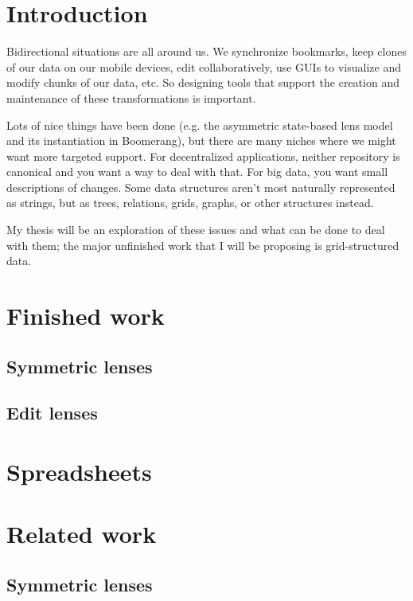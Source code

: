 \documentclass{book}
\begin{document}

\chapter{Introduction}
Bidirectional situations are all around us. We synchronize bookmarks, keep
clones of our data on our mobile devices, edit collaboratively, use GUIs to
visualize and modify chunks of our data, etc. So designing tools that
support the creation and maintenance of these transformations is important.

Lots of nice things have been done (e.g. the asymmetric state-based lens
model and its instantiation in Boomerang), but there are many niches where
we might want more targeted support. For decentralized applications, neither
repository is canonical and you want a way to deal with that. For big data,
you want small descriptions of changes. Some data structures aren't most
naturally represented as strings, but as trees, relations, grids, graphs, or
other structures instead.

My thesis will be an exploration of these issues and what can be done to
deal with them; the major unfinished work that I will be proposing is
grid-structured data.

\chapter{Finished work}
\section{Symmetric lenses}
\section{Edit lenses}

\chapter{Spreadsheets}


\chapter{Related work}
\section{Symmetric lenses}
\end{document}
